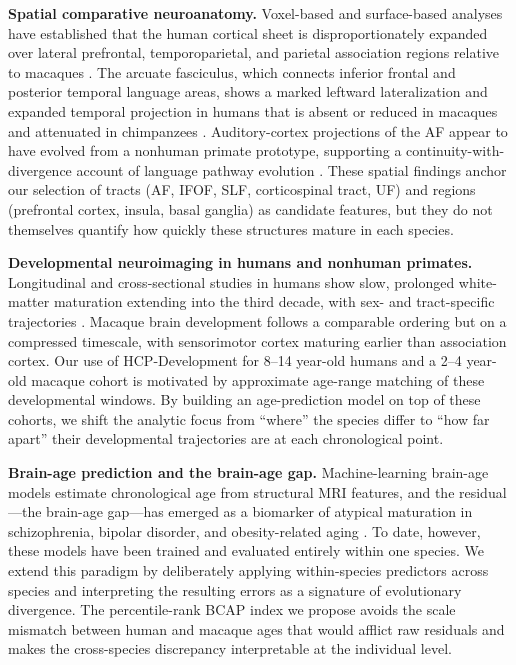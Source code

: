 \documentclass[11pt]{article}
\begin{document}
\textbf{Spatial comparative neuroanatomy.} Voxel-based and surface-based analyses have established that the human cortical sheet is disproportionately expanded over lateral prefrontal, temporoparietal, and parietal association regions relative to macaques \citep{hill2010similar, smaers2011primate, smaers2019brain}. The arcuate fasciculus, which connects inferior frontal and posterior temporal language areas, shows a marked leftward lateralization and expanded temporal projection in humans that is absent or reduced in macaques and attenuated in chimpanzees \citep{rilling2008evolution, rilling2012continuity, eichert2019special}. Auditory-cortex projections of the AF appear to have evolved from a nonhuman primate prototype, supporting a continuity-with-divergence account of language pathway evolution \citep{balezeau2020primate, catani2008arcuate, rocchi2021common}. These spatial findings anchor our selection of tracts (AF, IFOF, SLF, corticospinal tract, UF) and regions (prefrontal cortex, insula, basal ganglia) as candidate features, but they do not themselves quantify how quickly these structures mature in each species.

\textbf{Developmental neuroimaging in humans and nonhuman primates.} Longitudinal and cross-sectional studies in humans show slow, prolonged white-matter maturation extending into the third decade, with sex- and tract-specific trajectories \citep{dubois2014early, perrin2009sex, miller2012prolonged}. Macaque brain development follows a comparable ordering but on a compressed timescale, with sensorimotor cortex maturing earlier than association cortex. Our use of HCP-Development \citep{somerville2018lifespan, harms2018extending} for 8--14 year-old humans and a 2--4 year-old macaque cohort is motivated by approximate age-range matching of these developmental windows. By building an age-prediction model on top of these cohorts, we shift the analytic focus from ``where'' the species differ to ``how far apart'' their developmental trajectories are at each chronological point.

\textbf{Brain-age prediction and the brain-age gap.} Machine-learning brain-age models estimate chronological age from structural MRI features, and the residual---the brain-age gap---has emerged as a biomarker of atypical maturation in schizophrenia, bipolar disorder, and obesity-related aging \citep{cole2017predicting, franke2010estimating, hajek2019brain, mcwhinney2021obesity}. To date, however, these models have been trained and evaluated entirely within one species. We extend this paradigm by deliberately applying within-species predictors across species and interpreting the resulting errors as a signature of evolutionary divergence. The percentile-rank BCAP index we propose avoids the scale mismatch between human and macaque ages that would afflict raw residuals and makes the cross-species discrepancy interpretable at the individual level.
\end{document}
